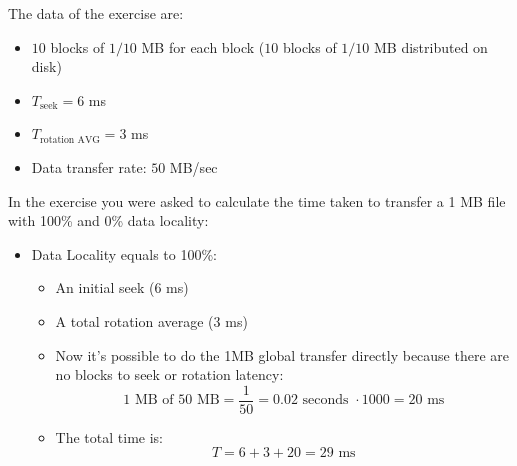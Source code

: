 \newpage

\begin{exercisebox}
    The data of the exercise are:
    \begin{itemize}
        \item $10$ blocks of $1/10$ MB for each block ($10$ blocks of $1/10$ MB  distributed on disk)
        \item $T_{\text{seek}} = 6$ ms
        \item $T_{\text{rotation AVG}} = 3$ ms
        \item Data transfer rate: $50$ MB/sec
    \end{itemize}
    In the exercise you were asked to calculate the time taken to transfer a 1 MB file with 100\% and 0\% data locality:
    \begin{itemize}
        \item Data Locality equals to 100\%:
        \begin{itemize}
            \item An initial seek ($6$ ms)
            \item A total rotation average ($3$ ms)
            \item Now it's possible to do the 1MB global transfer directly because there are no blocks to seek or rotation latency:
            \begin{equation*}
                \text{1 MB of 50 MB} = \dfrac{1}{50} = 0.02 \text{ seconds } \cdot 1000 = 20 \text{ ms}
            \end{equation*}
            \item The total time is:
            \begin{equation*}
                T = 6 + 3 + 20 = 29 \text{ ms}
            \end{equation*}
        \end{itemize}


\end{itemize}
\end{exercisebox}
